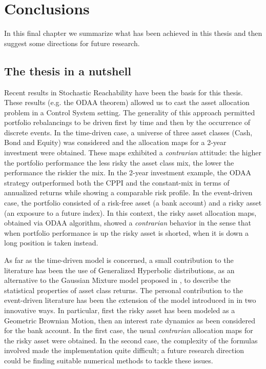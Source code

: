 \chapter{Conclusions}\label{chpt:Conclusions}
In this final chapter we summarize what has been achieved in this thesis and then suggest some directions for future research.

\section{The thesis in a nutshell}
Recent results in Stochastic Reachability have been the basis for this thesis. These results (e.g. the \gls{ODAA} theorem) allowed us to cast the asset allocation problem in a Control System setting. The generality of this approach permitted portfolio rebalancings to be driven first by time and then by the occurrence of discrete events. In the time-driven case, a universe of three asset classes (Cash, Bond and Equity) was considered and the allocation maps for a 2-year investment were obtained. These maps exhibited a \textit{contrarian} attitude: the higher the portfolio performance the less risky the asset class mix, the lower the performance the riskier the mix. In the 2-year investment example, the \gls{ODAA} strategy outperformed both the \gls{CPPI} and the constant-mix in terms of annualized returns while showing a comparable risk profile. In the event-driven case, the portfolio consisted of a risk-free asset (a bank account) and a risky asset (an exposure to a future index). In this context, the risky asset allocation maps, obtained via \gls{ODAA} algorithm, showed a \textit{contrarian} behavior in the sense that when portfolio performance is up the risky asset is shorted, when it is down a long position is taken instead.

As far as the time-driven model is concerned, a small contribution to the literature has been the use of Generalized Hyperbolic distributions, as an alternative to the Gaussian Mixture model proposed in \cite{Pola12}, to describe the statistical properties of asset class returns.
The personal contribution to the event-driven literature has been the extension of the model introduced in \cite{specchio2011} in two innovative ways. In particular, first the risky asset has been modeled as a Geometric Brownian Motion, then an interest rate dynamics as been considered for the bank account. In the first case, the usual \textit{contrarian} allocation maps for the risky asset were obtained. In the second case, the complexity of the formulas involved made the implementation quite difficult; a future research direction could be finding suitable numerical methods to tackle these issues. 
